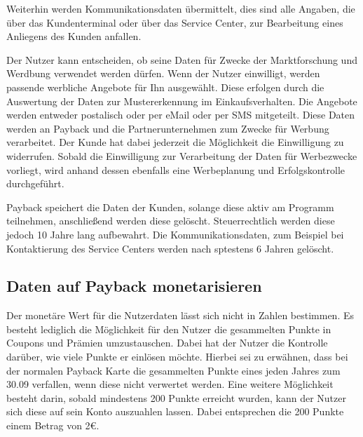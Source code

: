 Weiterhin werden Kommunikationsdaten übermittelt, dies sind alle Angaben, die über das Kundenterminal oder über das Service Center, zur Bearbeitung eines Anliegens des Kunden anfallen. \newline

\noindent Der Nutzer kann entscheiden, ob seine Daten für Zwecke der Marktforschung und Werdbung verwendet werden dürfen. Wenn der Nutzer einwilligt, werden passende werbliche Angebote für Ihn ausgewählt. Diese erfolgen durch die Auswertung der Daten zur Mustererkennung im Einkaufsverhalten. Die Angebote werden entweder postalisch oder per eMail oder per SMS mitgeteilt. Diese Daten werden an Payback und die Partnerunternehmen zum Zwecke für Werbung verarbeitet. Der Kunde hat dabei jederzeit die Möglichkeit die Einwilligung zu widerrufen. Sobald die Einwilligung zur Verarbeitung der Daten für Werbezwecke vorliegt, wird anhand dessen ebenfalls eine Werbeplanung und Erfolgskontrolle durchgeführt. \newline

\noindent Payback speichert die Daten der Kunden, solange diese aktiv am Programm teilnehmen, anschließend werden diese gelöscht. Steuerrechtlich werden diese jedoch 10 Jahre lang aufbewahrt. Die Kommunikationsdaten, zum Beispiel bei Kontaktierung des Service Centers werden nach sptestens 6 Jahren gelöscht.
\cite{Payback_Datenschutz}



\subsection{Daten auf Payback monetarisieren}
Der monetäre Wert für die Nutzerdaten lässt sich nicht in Zahlen bestimmen. 
\noindent Es besteht lediglich die Möglichkeit für den Nutzer die gesammelten Punkte in Coupons und Prämien umzustauschen. Dabei hat der Nutzer die Kontrolle darüber, wie viele Punkte er einlösen möchte. Hierbei sei zu erwähnen, dass bei der normalen Payback Karte die gesammelten Punkte eines jeden Jahres zum 30.09 verfallen, wenn diese nicht verwertet werden. 
Eine weitere Möglichkeit besteht darin, sobald mindestens 200 Punkte erreicht wurden, kann der Nutzer sich diese auf sein Konto auszuahlen lassen. Dabei entsprechen die 200 Punkte einem Betrag von 2€. \cite{Payback_Teilnahme} \newline

